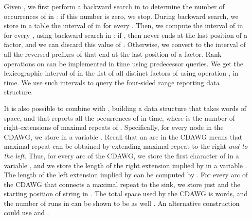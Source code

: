 \documentclass[a4paper,UKenglish]{lipics-v2016}
\begin{document}
Given , we first perform a backward search in  to determine the number of occurrences of  in : if this number is zero, we stop. During backward search, we store in a table the interval  of  in  for every . Then, we compute the interval  of  in  for every , using backward search in : if , then  never ends at the last position of a factor, and we can discard this value of . Otherwise, we convert  to the interval  of all the reversed prefixes of  that end at the last position of a factor. Rank operations on  can be implemented in  time using predecessor queries. We get the lexicographic interval of  in the list of all distinct factors of  using operation , in  time. We use such intervals to query the four-sided range reporting data structure.

It is also possible to combine  with , building a data structure that takes  words of space, and that reports all the  occurrences of  in  time, where  is the number of right-extensions of maximal repeats of  \cite{belazzougui2015composite}. Specifically, for every node  in the CDAWG, we store  in a variable . Recall that an arc  in the CDAWG means that maximal repeat  can be obtained by extending maximal repeat  to the right \emph{and to the left}. Thus, for every arc  of the CDAWG, we store the first character of  in a variable , and we store the length of the right extension implied by  in a variable . The length  of the left extension implied by  can be computed by . For every arc of the CDAWG that connects a maximal repeat  to the sink, we store just  and the starting position  of string  in . The total space used by the CDAWG is  words, and the number of runs in  can be shown to be  as well \cite{belazzougui2015composite}. An alternative construction could use  and .
\end{document}
